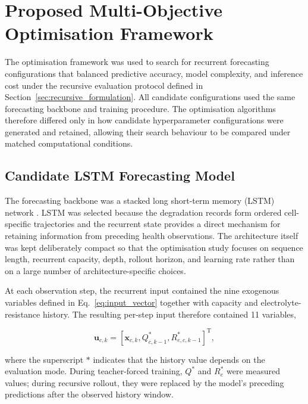 \documentclass[a4paper,fleqn]{cas-sc}
\begin{document}
\section{Proposed Multi-Objective Optimisation Framework}
\label{sec:optimisation_framework}

The optimisation framework was used to search for recurrent forecasting configurations that balanced predictive accuracy, model complexity, and inference cost under the recursive evaluation protocol defined in Section~\ref{sec:recursive_formulation}. All candidate configurations used the same forecasting backbone and training procedure. The optimisation algorithms therefore differed only in how candidate hyperparameter configurations were generated and retained, allowing their search behaviour to be compared under matched computational conditions.


\subsection{Candidate LSTM Forecasting Model}
\label{sec:lstm_model}

The forecasting backbone was a stacked long short-term memory (LSTM) network \cite{hochreiter1997lstm}. LSTM was selected because the degradation records form ordered cell-specific trajectories and the recurrent state provides a direct mechanism for retaining information from preceding health observations. The architecture itself was kept deliberately compact so that the optimisation study focuses on sequence length, recurrent capacity, depth, rollout horizon, and learning rate rather than on a large number of architecture-specific choices.

At each observation step, the recurrent input contained the nine exogenous variables defined in Eq.~\eqref{eq:input_vector} together with capacity and electrolyte-resistance history. The resulting per-step input therefore contained 11 variables,

\begin{equation}
\mathbf{u}_{c,k}
=
\left[
\mathbf{x}_{c,k},
Q^{*}_{c,k-1},
R^{*}_{e,c,k-1}
\right]^{\mathrm{T}},
\label{eq:lstm_input}
\end{equation}

where the superscript $*$ indicates that the history value depends on the evaluation mode. During teacher-forced training, $Q^{*}$ and $R^{*}_{e}$ were measured values; during recursive rollout, they were replaced by the model's preceding predictions after the observed history window.
\end{document}
